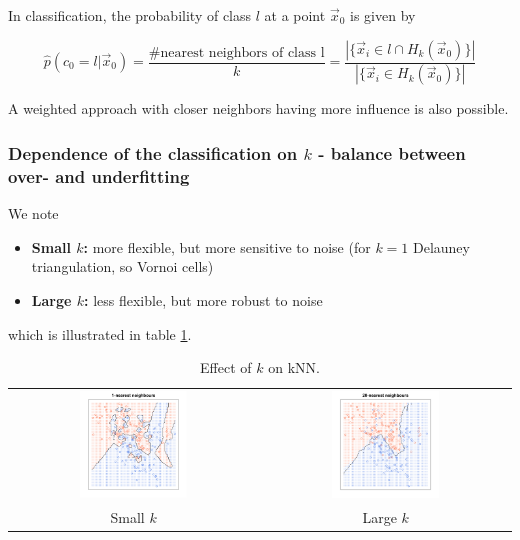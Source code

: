 In classification, the probability of class $l$ at a point $\vec{x}_0$ is given by

\begin{equation}
    \hat{p}(c_0 = l|\vec{x}_0) = \frac{\# \text{nearest neighbors of class l}}{k} = \frac{|\{ \vec{x}_i \in l \cap H_k(\vec{x}_0) \}|}{|\{ \vec{x}_i \in H_k(\vec{x}_0) \}|}
\end{equation}

A weighted approach with closer neighbors having more influence is also possible.

\subsubsection{Dependence of the classification on $k$ - balance between over- and underfitting}
We note
\begin{itemize}
    \item \textbf{Small $k$:} more flexible, but more sensitive to noise (for $k=1$ Delauney triangulation, so Vornoi cells)
    \item \textbf{Large $k$:} less flexible, but more robust to noise
\end{itemize}
which is illustrated in table \ref{tab:knn_k}.

\begin{table}[H]
    \centering
    \begin{tabular}{c|c}
        \includegraphics[width=0.45\textwidth]{figures/knn_small_k.png} & \includegraphics[width=0.45\textwidth]{figures/knn_large_k.png} \\
        Small $k$ & Large $k$
    \end{tabular}
    \caption{Effect of $k$ on kNN.}
    \label{tab:knn_k}
\end{table}

